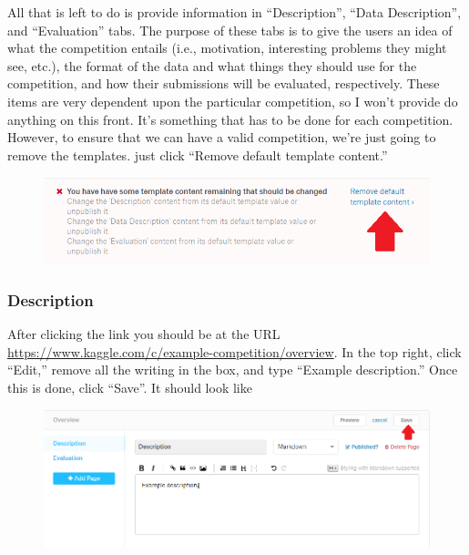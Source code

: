 \documentclass{article}
\begin{document}
All that is left to do is provide information in ``Description'', ``Data
Description'', and ``Evaluation'' tabs. The purpose of these tabs is to
give the users an idea of what the competition entails (i.e.,
motivation, interesting problems they might see, etc.), the format of the
data and what things they should use for the competition, and how their
submissions will be evaluated, respectively. These items are very
dependent upon the particular competition, so I won't provide do
anything on this front. It's something that has to be done for each
competition. However, to ensure that we can have a valid competition,
we're just going to remove the templates. just click ``Remove default
template content.''

\begin{figure}[H]
    \centering
    \includegraphics[width=\linewidth]{figures/remove-templates.PNG}
\end{figure}

\subsubsection{Description}\label{description}

After clicking the link you should be at the URL
\url{https://www.kaggle.com/c/example-competition/overview}. In the top
right, click ``Edit,'' remove all the writing in the box, and type
``Example description.'' Once this is done, click ``Save''. It should
look like

\begin{figure}[H]
    \centering
    \includegraphics[width=\linewidth]{figures/example-description.PNG}
\end{figure}
\end{document}
